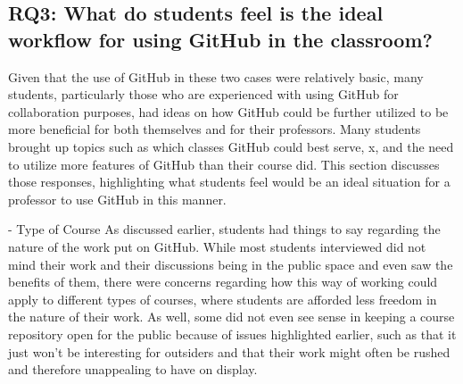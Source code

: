 



\subsection{RQ3: What do students feel is the ideal workflow for using GitHub in the classroom?}

Given that the use of GitHub in these two cases were relatively basic, many students, particularly those who are experienced with using GitHub for collaboration purposes, had ideas on how GitHub could be further utilized to be more beneficial for both themselves and for their professors. Many students brought up topics such as which classes GitHub could best serve, x, and the need to utilize more features of GitHub than their course did. This section discusses those responses, highlighting what students feel would be an ideal situation for a professor to use GitHub in this manner.

- Type of Course
As discussed earlier, students had things to say regarding the nature of the work put on GitHub. While most students interviewed did not mind their work and their discussions being in the public space and even saw the benefits of them, there were concerns regarding how this way of working could apply to different types of courses, where students are afforded less freedom in the nature of their work. As well, some did not even see sense in keeping a course repository open for the public because of issues highlighted earlier, such as that it just won't be interesting for outsiders and that their work might often be rushed and therefore unappealing to have on display.

